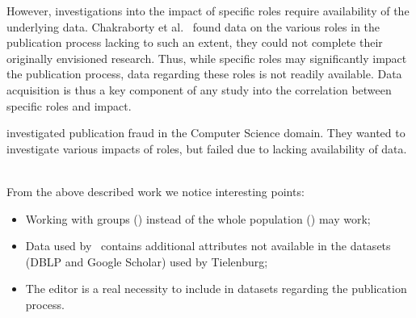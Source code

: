 \documentclass{ou-report}
\newcommand{\todo}[1]{{\color{red} TODO: #1}}
\begin{document}
However, investigations into the impact of specific roles require availability of
the underlying data. Chakraborty et al.~\cite{CPN2021} found data on the various
roles in the publication process lacking to such an extent, they could not complete
their originally envisioned research. Thus, while specific roles may significantly
impact the publication process, data regarding these roles is not readily available.
Data acquisition is thus a key component of any study into the correlation between
specific roles and impact.

investigated publication fraud in the Computer
Science domain. They wanted to investigate various impacts of roles, but failed due
to lacking availability of data.


\ \\
From the above described work we notice interesting points:
\begin{itemize}
    \item Working with groups (\cite{SNCMBL2021}) instead of the whole 
        population (\cite{TEJ2017}) may work;
    \item Data used by~\cite{SNCMBL2021} contains additional attributes not 
        available in the datasets (DBLP and Google Scholar) used by Tielenburg;
    \item The editor is a real necessity to include in datasets regarding the 
        publication process.
\end{itemize}



\end{document}
